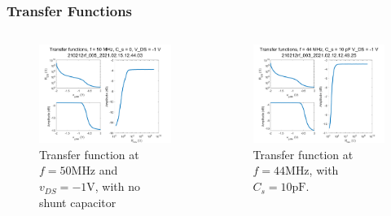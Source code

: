 \documentclass{beamer}
\begin{document}
\begin{frame}
    \frametitle{Transfer Functions}

    \begin{columns}
        \begin{column}{0.5\textwidth}
            \begin{figure}
                \includegraphics[width = 1.1\textwidth]{210212rf_005_2021.02.15.12.44.03_final_rf-transfer.png}
                \caption{Transfer function at $f = 50\si{\mega\hertz}$ and $v_{DS} = -1\si{\volt}$, with no shunt capacitor}
            \end{figure}
        \end{column}
        \begin{column}{0.5\textwidth}
            \begin{figure}
                \includegraphics[width = 1.1\textwidth]{210212rf_003_2021.02.12.12.49.25_final_rf-transfer.png}
                \caption{Transfer function at $f = 44\si{\mega\hertz}$, with $C_s = 10\si{\pico\farad}$.}
            \end{figure}
        \end{column}
    \end{columns}

\end{frame}
\end{document}
